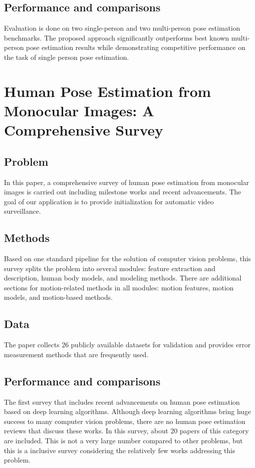 \documentclass[runningheads,a4paper,11pt]{report}
\begin{document}
\subsection{Performance and comparisons}
Evaluation is done on two single-person and two multi-person pose estimation benchmarks. The proposed approach significantly outperforms best known multi-person pose estimation results while demonstrating competitive performance on the task of single person pose estimation.

\section{Human Pose Estimation from Monocular Images: A Comprehensive Survey
\cite{humanmonocular}}

\subsection{Problem}
\par In this paper, a comprehensive survey of human pose estimation from monocular images is carried out including milestone works and recent advancements. The goal of our application is to provide initialization for automatic video surveillance. 
\subsection{Methods}
\par Based on one standard pipeline for the solution of computer vision problems, this survey splits the problem into several modules: feature extraction and description, human body models, and modeling methods. There are additional sections for motion-related methods in all modules: motion features, motion models, and motion-based methods.

\subsection{Data}
The paper collects 26 publicly available datasets for validation and provides error measurement methods that are frequently used.
\subsection{Performance and comparisons}
\par The first survey that includes recent advancements on human pose estimation based on deep learning algorithms. Although deep learning algorithms bring huge success to many computer vision problems, there are no human pose estimation reviews that discuss these works. In this survey, about 20 papers of this category are included. This is not a very large number compared to other problems, but this is a inclusive survey considering the relatively few works addressing this problem.
\end{document}
